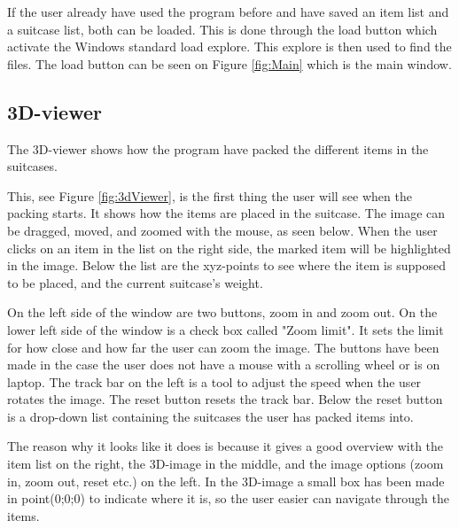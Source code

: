 If the user already have used the program before and have saved an item list and a suitcase list, both can be loaded. This is done through the load button which activate the Windows standard load explore. This explore is then used to find the files. The load button can be seen on Figure \ref{fig:Main} which is the main window.

\subsection{3D-viewer}
The 3D-viewer shows how the program have packed the different items in the suitcases.


This, see Figure \ref{fig:3dViewer}, is the first thing the user will see when the packing starts. It shows how the items are placed in the suitcase.
The image can be dragged, moved, and zoomed with the mouse, as seen below. When the user clicks on an item in the list on the right side, the marked item will be highlighted in the image. Below the list are the xyz-points to see where the item is supposed to be placed, and the current suitcase's weight.

On the left side of the window are two buttons, zoom in and zoom out. On the lower left side of the window is a check box called "Zoom limit". It sets the limit for how close and how far the user can zoom the image. The buttons have been made in the case the user does not have a mouse with a scrolling wheel or is on laptop. The track bar on the left is a tool to adjust the speed when the user rotates the image. The reset button resets the track bar. Below the reset button is a drop-down list containing the suitcases the user has packed items into.

The reason why it looks like it does is because it gives a good overview with the item list on the right, the 3D-image in the middle, and the image options (zoom in, zoom out, reset etc.) on the left.
In the 3D-image a small box has been made in point(0;0;0) to indicate where it is, so the user easier can navigate through the items.
